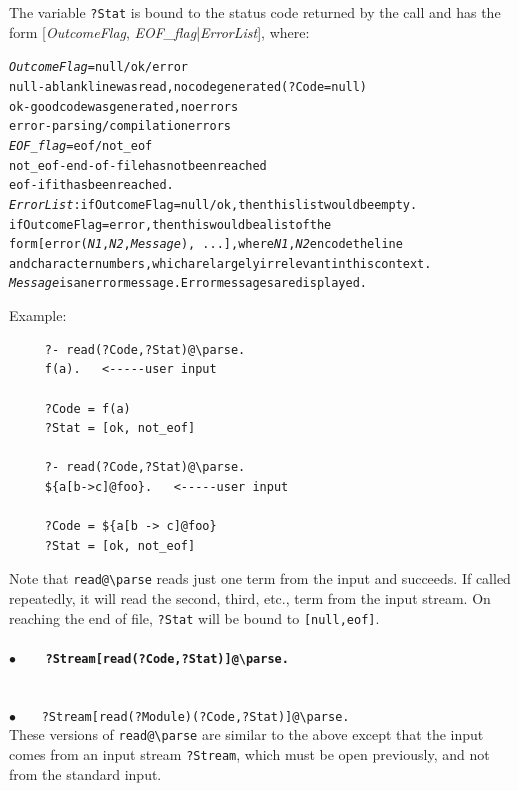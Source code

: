 \documentclass[11pt]{article}
\newcommand{\bs}{\textbackslash}
\begin{document}
\noindent
The variable {\tt ?Stat} is bound to the status code returned by the call
and has the form [\emph{OutcomeFlag}, \emph{EOF\_flag}|\emph{ErrorList}], where:
\begin{alltt}
{\rm \emph{OutcomeFlag} = null/ok/error
                  null  - a blank line was read, no code generated (?Code = null)
                  ok    - good code was generated, no errors
                  error - parsing/compilation errors
  \emph{EOF\_flag} = eof/not\_eof
                  not\_eof -  end-of-file has not been reached
                  eof       -  if it has been reached. 
  \emph{ErrorList}:  if OutcomeFlag=null/ok, then this list would be empty.
                  if OutcomeFlag=error, then this would be a list of the
                  form {\tt [error(\textnormal{\emph{N1}},\textnormal{\emph{N2}},\textnormal{\emph{Message}}), ...]}, where \emph{N1}, \emph{N2} encode the line
                  and character numbers, which are largely irrelevant in this context.
                  \emph{Message} is an error message. Error messages are displayed.}
\end{alltt}
  Example:
\begin{verbatim}
     ?- read(?Code,?Stat)@\parse.
     f(a).   <-----user input

     ?Code = f(a)
     ?Stat = [ok, not_eof]

     ?- read(?Code,?Stat)@\parse.
     ${a[b->c]@foo}.   <-----user input

     ?Code = ${a[b -> c]@foo}
     ?Stat = [ok, not_eof]
\end{verbatim}

  \noindent
  Note that \texttt{read@\bs{}parse} reads just one term from the input and
  succeeds. If called repeatedly, it will read the second, third, etc.,
  term from the input stream. On reaching the end of file,
  \texttt{?Stat} will be bound to \texttt{[null,eof]}.  

  \paragraph{$\bullet$~~~ \tt  ?Stream[read(?Code,?Stat)]@\bs{}parse.} ~~\\
  {$\bullet$~~~ \tt  ?Stream[read(?Module)(?Code,?Stat)]@\bs{}parse.} ~~\\
  These versions of \texttt{read@\bs{}parse} are similar to the above
  except that the input comes from an input stream \texttt{?Stream}, which
  must be open previously, and not from the standard input.
\end{document}

